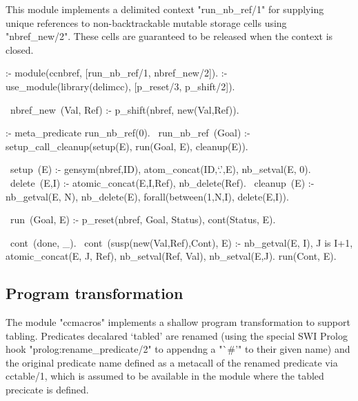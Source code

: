 This module implements a delimited context "run_nb_ref/1" 
for supplying unique references
to non-backtrackable mutable storage cells using "nbref_new/2".
These cells are guaranteed to be
released when the context is closed. 
\begin{prolog-framed}[name=ccnbref]
  :- module(ccnbref, [run_nb_ref/1, nbref_new/2]).
  :- use_module(library(delimcc), [p_reset/3, p_shift/2]).

  ~nbref_new~(Val, Ref) :- p_shift(nbref, new(Val,Ref)).

  :- meta_predicate run_nb_ref(0).
  ~run_nb_ref~(Goal) :- 
    setup_call_cleanup(setup(E), run(Goal, E), cleanup(E)).

  ~setup~(E) :- gensym(nbref,ID), atom_concat(ID,`.',E), nb_setval(E, 0).
  ~delete~(E,I) :- atomic_concat(E,I,Ref), nb_delete(Ref).
  ~cleanup~(E) :- nb_getval(E, N), nb_delete(E), 
                 forall(between(1,N,I), delete(E,I)).

  ~run~(Goal, E) :- p_reset(nbref, Goal, Status), cont(Status, E).

  ~cont~(done, _).
  ~cont~(susp(new(Val,Ref),Cont), E) :- 
    nb_getval(E, I), J is I+1, atomic_concat(E, J, Ref),
    nb_setval(Ref, Val), nb_setval(E,J).
    run(Cont, E).
\end{prolog-framed}

\subsection{Program transformation}
\label{sec:ccmacros}

The module "ccmacros" implements a shallow program transformation to support
tabling. Predicates decalared `tabled' are renamed (using the special
SWI Prolog hook "prolog:rename_predicate/2" to appendng
a "`#'" to their given name) and the original predicate name defined
as a metacall of the renamed predicate via cctable/1, which is 
assumed to be available in the module where the tabled precicate
is defined. 

